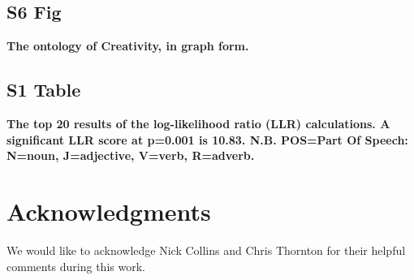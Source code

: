 \documentclass[10pt,letterpaper]{article}
\begin{document}
\subsection*{S6 Fig}
\label{S6_Fig}
{\bf The ontology of Creativity, in graph form.}

\subsection*{S1 Table}
\label{S1_Table}
{\bf The top 20 results of the log-likelihood ratio (LLR) calculations. A significant LLR score at p=0.001 is 10.83. N.B. POS=Part Of Speech: N=noun, J=adjective, V=verb, R=adverb.} 

\section*{Acknowledgments}
We would like to acknowledge Nick Collins and Chris Thornton for their helpful comments during this work. 
\end{document}
